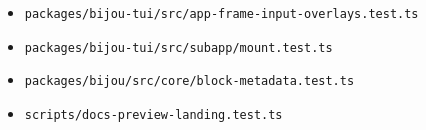 \begin{itemize}
\tightlist
\item
  \texttt{p\allowbreak{}a\allowbreak{}c\allowbreak{}k\allowbreak{}a\allowbreak{}g\allowbreak{}e\allowbreak{}s\allowbreak{}/\allowbreak{}b\allowbreak{}i\allowbreak{}j\allowbreak{}o\allowbreak{}u\allowbreak{}-\allowbreak{}t\allowbreak{}u\allowbreak{}i\allowbreak{}/\allowbreak{}s\allowbreak{}r\allowbreak{}c\allowbreak{}/\allowbreak{}a\allowbreak{}p\allowbreak{}p\allowbreak{}-\allowbreak{}f\allowbreak{}r\allowbreak{}a\allowbreak{}m\allowbreak{}e\allowbreak{}-\allowbreak{}i\allowbreak{}n\allowbreak{}p\allowbreak{}u\allowbreak{}t\allowbreak{}-\allowbreak{}o\allowbreak{}v\allowbreak{}e\allowbreak{}r\allowbreak{}l\allowbreak{}a\allowbreak{}y\allowbreak{}s\allowbreak{}.\allowbreak{}t\allowbreak{}e\allowbreak{}s\allowbreak{}t\allowbreak{}.\allowbreak{}t\allowbreak{}s}
\item
  \texttt{p\allowbreak{}a\allowbreak{}c\allowbreak{}k\allowbreak{}a\allowbreak{}g\allowbreak{}e\allowbreak{}s\allowbreak{}/\allowbreak{}b\allowbreak{}i\allowbreak{}j\allowbreak{}o\allowbreak{}u\allowbreak{}-\allowbreak{}t\allowbreak{}u\allowbreak{}i\allowbreak{}/\allowbreak{}s\allowbreak{}r\allowbreak{}c\allowbreak{}/\allowbreak{}s\allowbreak{}u\allowbreak{}b\allowbreak{}a\allowbreak{}p\allowbreak{}p\allowbreak{}/\allowbreak{}m\allowbreak{}o\allowbreak{}u\allowbreak{}n\allowbreak{}t\allowbreak{}.\allowbreak{}t\allowbreak{}e\allowbreak{}s\allowbreak{}t\allowbreak{}.\allowbreak{}t\allowbreak{}s}
\item
  \texttt{p\allowbreak{}a\allowbreak{}c\allowbreak{}k\allowbreak{}a\allowbreak{}g\allowbreak{}e\allowbreak{}s\allowbreak{}/\allowbreak{}b\allowbreak{}i\allowbreak{}j\allowbreak{}o\allowbreak{}u\allowbreak{}/\allowbreak{}s\allowbreak{}r\allowbreak{}c\allowbreak{}/\allowbreak{}c\allowbreak{}o\allowbreak{}r\allowbreak{}e\allowbreak{}/\allowbreak{}b\allowbreak{}l\allowbreak{}o\allowbreak{}c\allowbreak{}k\allowbreak{}-\allowbreak{}m\allowbreak{}e\allowbreak{}t\allowbreak{}a\allowbreak{}d\allowbreak{}a\allowbreak{}t\allowbreak{}a\allowbreak{}.\allowbreak{}t\allowbreak{}e\allowbreak{}s\allowbreak{}t\allowbreak{}.\allowbreak{}t\allowbreak{}s}
\item
  \texttt{s\allowbreak{}c\allowbreak{}r\allowbreak{}i\allowbreak{}p\allowbreak{}t\allowbreak{}s\allowbreak{}/\allowbreak{}d\allowbreak{}o\allowbreak{}c\allowbreak{}s\allowbreak{}-\allowbreak{}p\allowbreak{}r\allowbreak{}e\allowbreak{}v\allowbreak{}i\allowbreak{}e\allowbreak{}w\allowbreak{}-\allowbreak{}l\allowbreak{}a\allowbreak{}n\allowbreak{}d\allowbreak{}i\allowbreak{}n\allowbreak{}g\allowbreak{}.\allowbreak{}t\allowbreak{}e\allowbreak{}s\allowbreak{}t\allowbreak{}.\allowbreak{}t\allowbreak{}s}

\end{itemize}

